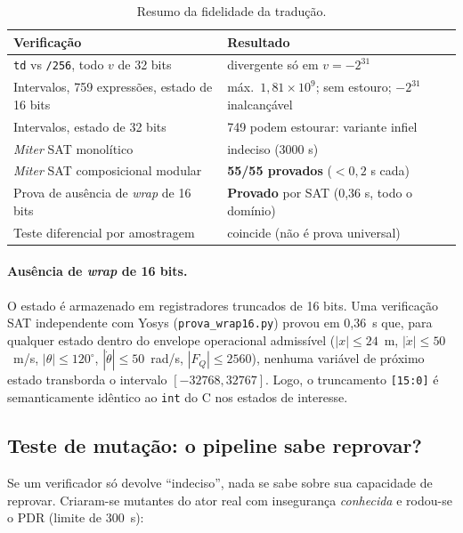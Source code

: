 \documentclass[12pt,openright,oneside,a4paper,chapter=TITLE,sumario=tradicional,english,brazil]{abntex2}
\begin{document}
\begin{table}[htb]
\caption{Resumo da fidelidade da tradução.}\label{tab:fid}
\centering
\begin{tabular}{p{7.2cm}|p{5.6cm}}
\toprule
\textbf{Verificação} & \textbf{Resultado} \\
\midrule
\texttt{td} vs \texttt{/256}, todo $v$ de 32 bits & divergente só em $v=-2^{31}$ \\
Intervalos, 759 expressões, estado de 16 bits & máx.\ $1{,}81\times10^9$; sem estouro; $-2^{31}$ inalcançável \\
Intervalos, estado de 32 bits & 749 podem estourar: variante infiel \\
\emph{Miter} SAT monolítico & indeciso (3000 s) \\
\emph{Miter} SAT composicional modular & \textbf{55/55 provados} ($<0{,}2$ s cada) \\
Prova de ausência de \emph{wrap} de 16 bits & \textbf{Provado} por SAT (0,36 s, todo o domínio) \\
Teste diferencial por amostragem & coincide (não é prova universal) \\
\bottomrule
\end{tabular}
\end{table}

\paragraph{Ausência de \emph{wrap} de 16 bits.} O estado é armazenado em registradores truncados de 16 bits. Uma verificação SAT independente com Yosys (\texttt{prova\_wrap16.py}) provou em 0,36~s que, para qualquer estado dentro do envelope operacional admissível ($|x|\le24$~m, $|\dot x|\le50$~m/s, $|\theta|\le120^\circ$, $|\dot\theta|\le50$~rad/s, $|F_Q|\le2560$), nenhuma variável de próximo estado transborda o intervalo $[-32768, 32767]$. Logo, o truncamento \texttt{[15:0]} é semanticamente idêntico ao \texttt{int} do C nos estados de interesse.

\subsection{Teste de mutação: o pipeline sabe reprovar?}

Se um verificador só devolve ``indeciso'', nada se sabe sobre sua capacidade de reprovar. Criaram-se mutantes do ator real com insegurança \emph{conhecida} e rodou-se o PDR (limite de 300~s):
\end{document}
